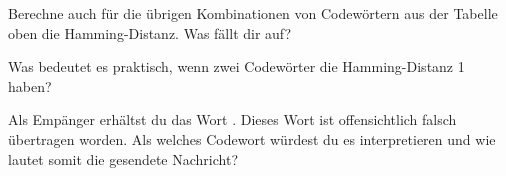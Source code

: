 \documentclass[10pt, a4paper]{scrartcl}
\begin{document}
\begin{aufgabe}
	Berechne auch für die übrigen Kombinationen von Codewörtern aus der Tabelle oben die Hamming-Distanz. Was fällt dir auf?
	
	Was bedeutet es praktisch, wenn zwei Codewörter die Hamming-Distanz 1 haben?
\end{aufgabe}

\begin{aufgabe}
	Als Empänger erhältst du das Wort . Dieses Wort ist offensichtlich falsch übertragen worden. Als welches Codewort würdest du es interpretieren und wie lautet somit die gesendete Nachricht?
\end{aufgabe}
\end{document}
